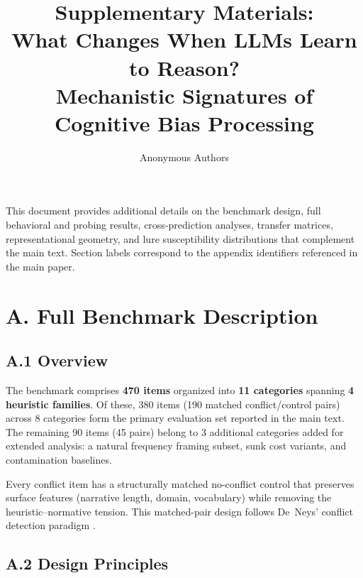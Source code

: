 \documentclass[accepted]{article}
\title{Supplementary Materials:\\
  What Changes When LLMs Learn to Reason?\\
  Mechanistic Signatures of Cognitive Bias Processing}
\author{%
  Anonymous Authors
}
\date{}
\begin{document}
\maketitle

\noindent This document provides additional details on the benchmark
design, full behavioral and probing results, cross-prediction analyses,
transfer matrices, representational geometry, and lure susceptibility
distributions that complement the main text.  Section labels correspond
to the appendix identifiers referenced in the main paper.


\section*{A. Full Benchmark Description}
\label{sec:appendix_benchmark}

\subsection*{A.1 Overview}

The benchmark comprises \textbf{470 items} organized into \textbf{11
categories} spanning \textbf{4 heuristic families}.  Of these, 380
items (190 matched conflict/control pairs) across 8 categories form the
primary evaluation set reported in the main text.  The remaining 90
items (45 pairs) belong to 3 additional categories added for extended
analysis: a natural frequency framing subset, sunk cost variants, and
contamination baselines.

Every conflict item has a structurally matched no-conflict control that
preserves surface features (narrative length, domain, vocabulary) while
removing the heuristic--normative tension.  This matched-pair design
follows De~Neys' conflict detection paradigm \citep{deneys2012bias}.

\subsection*{A.2 Design Principles}
\end{document}
